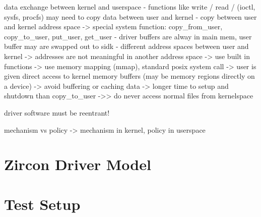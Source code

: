 

data exchange between kernel and userspace
- functions like write / read / (ioctl, sysfs, procfs) may need to copy data between user and kernel
- copy between user and kernel address space -> special system function: copy_from_user, copy_to_user, put_user, get_user
- driver buffers are alway in main mem, user buffer may are swapped out to sidk
\cite{lfd430}
- different address spaces between user and kernel -> addresses are not meaningful in another address space
-> use built in functions
-> use memory mapping (mmap), standard posix system call -> user is given direct access to kernel memory buffers (may be memory regions directly on a device) -> avoid buffering or caching data -> longer time to setup and shutdown than copy_to_user
->> do never access normal files from kernelspace


driver software must be reentrant!

\cite{lfd430}
mechanism vs policy -> mechanism in kernel, policy in userspace

%

\section{Zircon Driver Model}

\section{Test Setup}

